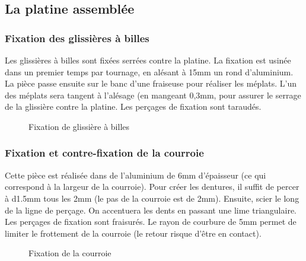 \subsection{La platine assemblée}%
\subsubsection{Fixation des glissières à billes}%
Les glissières à billes sont fixées serrées contre la platine. La fixation est usinée dans un premier temps par tournage, en alésant à 15mm un rond d'aluminium. %
La pièce passe ensuite sur le banc d'une fraiseuse pour réaliser les méplats. L'un des méplats sera tangent à l'alésage (en mangeant 0,3mm, pour assurer le serrage %
de la glissière contre la platine. Les perçages de fixation sont taraudés.
\begin{figure}%
   \caption{\label{bushing-bracket} Fixation de glissière à billes}%
\end{figure}%
\subsubsection{Fixation et contre-fixation de la courroie}%
Cette pièce est réalisée dans de l'aluminium de 6mm d'épaisseur (ce qui correspond à la largeur de la courroie). Pour créer les dentures, il suffit de percer à d1.5mm %
tous les 2mm (le pas de la courroie est de 2mm). Ensuite, scier le long de la ligne de perçage. On accentuera les dents en passant une lime triangulaire. Les %
perçages de fixation sont fraisurés. Le rayon de courbure de 5mm permet de limiter le frottement de la courroie (le retour risque d'être en contact).
\begin{figure}%
   \caption{\label{belt-blocker} Fixation de la courroie}%
\end{figure}%
